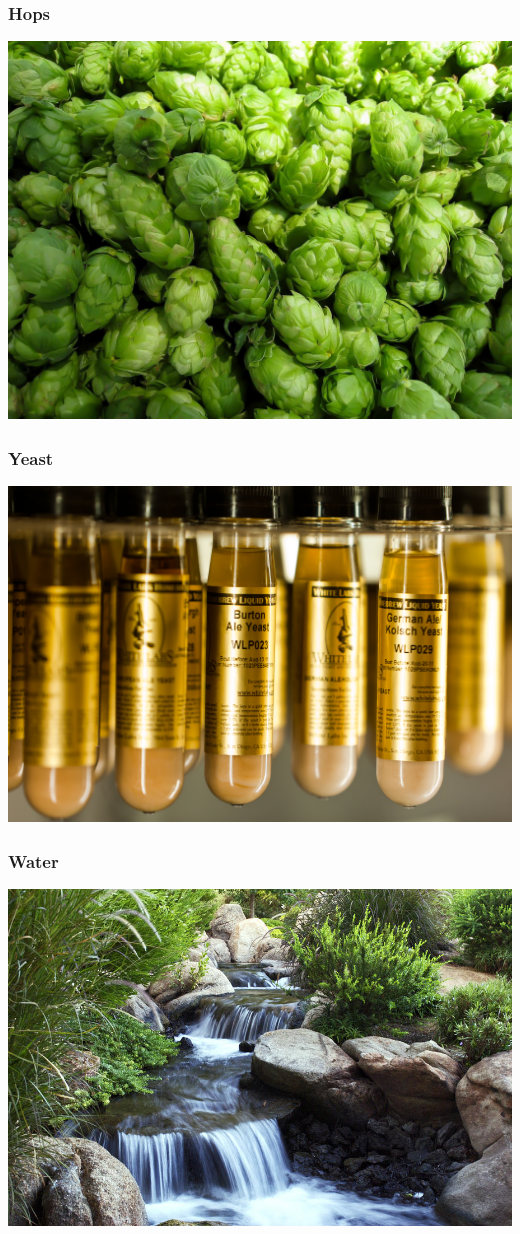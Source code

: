 \documentclass{beamer}
\begin{document}
\begin{frame}
  \frametitle{Hops}
    \includegraphics[width=\textwidth]{hops.jpg}
\end{frame}

\begin{frame}
  \frametitle{Yeast}
    \includegraphics[width=\textwidth]{yeast.png}

\end{frame}

\begin{frame}
  \frametitle{Water}
    \includegraphics[width=\textwidth]{water.jpg}

\end{frame}
\end{document}
